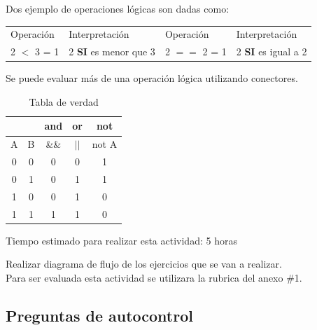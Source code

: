 \documentclass[a4paper,12pt,spanish]{article}
\begin{document}
Dos ejemplo de operaciones lógicas son dadas como:\\
\begin{tabular}[H]{ll||ll}
  Operación & Interpretación & Operación & Interpretación  \\
  2 $<$  3 = 1 & 2 \textbf{SI} es menor que 3 & 2 $==$ 2 = 1 &  2 \textbf{SI} es igual a 2 \\
  
\end{tabular}

Se puede evaluar más de una operación lógica utilizando conectores.
\begin{table}[H]
  \centering
  \begin{tabular}{|c|c|c|c|c|}
    \hline \hline
     & &  and &  or  & not \\ \hline
    A&B& \&\& & $||$ & not A \\ \hline \hline
    0&0&  0   &  0   &  1  \\  \hline
    0&1&  0   &  1   &  1  \\  \hline
    1&0&  0   &  1   &  0  \\  \hline
    1&1&  1   &  1   &  0  \\  \hline

  \end{tabular}
  \caption{Tabla de verdad}
  \label{tab:tverdad}
\end{table}


\begin{tcolorbox}[skin=widget,
boxrule=1mm,
coltitle=black,
colframe=blue!45!white,
colback=blue!15!white,
width=(1\linewidth),before=\hfill,after=\hfill,
adjusted title={{\Large Actividad A1}:\textbf{Entrega de la propuesta del proyecto final}}]
Tiempo estimado para realizar esta actividad: 5 horas
\tcblower

Realizar diagrama de flujo de los ejercicios que se van a realizar.\\

Para ser evaluada esta actividad se utilizara la rubrica del anexo \#1.


\end{tcolorbox}




\newpage
\subsection{Preguntas de autocontrol}
\label{sec:preg-de-autoc-3}
\end{document}
